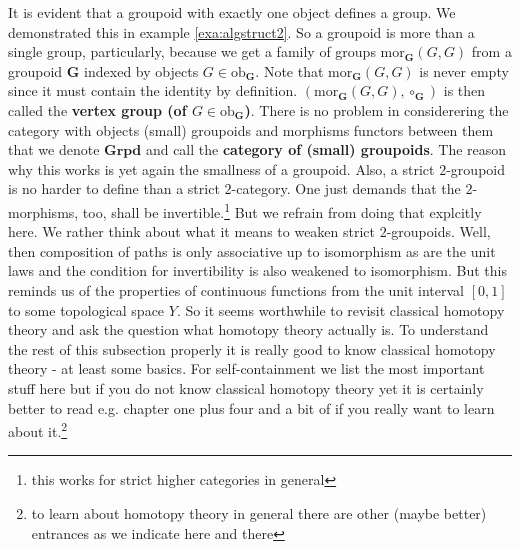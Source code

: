 It is evident that a groupoid with exactly one object defines a group. We demonstrated this in example \ref{exa:algstruct2}. So a groupoid is more than a single group, particularly, because we get a family of groups $\mathrm{mor}_{\mathbf{G}}(G,G)$ from a groupoid $\mathbf{G}$ indexed by objects $G \in \mathrm{ob}_{\mathbf{G}}$. Note that $\mathrm{mor}_{\mathbf{G}}(G,G)$ is never empty since it must contain the identity by definition. $(\mathrm{mor}_{\mathbf{G}}(G,G),\circ_{\mathbf{G}})$ is then called the \textbf{vertex group (of $G \in \mathrm{ob}_{\mathbf{G}}$)}. There is no problem in considerering the category with objects (small) groupoids and morphisms functors between them that we denote $\mathbf{Grpd}$ and call the \textbf{category of (small) groupoids}. The reason why this works is yet again the smallness of a groupoid. Also, a strict $2$-groupoid is no harder to define than a strict $2$-category. One just demands that the $2$-morphisms, too, shall be invertible.\footnote{this works for strict higher categories in general} But we refrain from doing that explcitly here. We rather think about what it means to weaken strict $2$-groupoids. Well, then composition of paths is only associative up to isomorphism as are the unit laws and the condition for invertibility is also weakened to isomorphism. But this reminds us of the properties of continuous functions from the unit interval $[0,1]$ to some topological space $Y$. So it seems worthwhile to revisit classical homotopy theory and ask the question what homotopy theory actually is. To understand the rest of this subsection properly it is really good to know classical homotopy theory - at least some basics. For self-containment we list the most important stuff here but if you do not know classical homotopy theory yet it is certainly better to read e.g. \cite{8b5861fc} chapter one plus four and a bit of \cite{78202e13} if you really want to learn about it.\footnote{to learn about homotopy theory in general there are other (maybe better) entrances as we indicate here and there}
